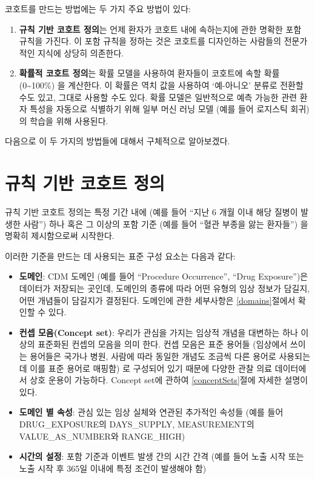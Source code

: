 \documentclass[11pt]{book}
\providecommand{\tightlist}{%
  \setlength{\itemsep}{0pt}\setlength{\parskip}{0pt}}
\theoremstyle{definition}
\theoremstyle{definition}
\theoremstyle{definition}
\theoremstyle{remark}
\begin{document}
코호트를 만드는 방법에는 두 가지 주요 방법이 있다:

\begin{enumerate}
\def\labelenumi{\arabic{enumi}.}
\tightlist
\item
  \textbf{규칙 기반 코호트 정의}는 언제 환자가 코호트 내에 속하는지에
  관한 명확한 포함 규칙을 가진다. 이 포함 규칙을 정하는 것은 코호트를
  디자인하는 사람들의 전문가적인 지식에 상당히 의존한다.
\item
  \textbf{확률적 코호트 정의}는 확률 모델을 사용하여 환자들이 코호트에
  속할 확률 (0\textasciitilde{}100\%) 을 계산한다. 이 확률은 역치 값을
  사용하여 `예-아니오' 분류로 전환할 수도 있고, 그대로 사용할 수도 있다.
  확률 모델은 일반적으로 예측 가능한 관련 환자 특성을 자동으로 식별하기
  위해 일부 머신 러닝 모델 (예를 들어 로지스틱 회귀) 의 학습을 위해
  사용된다.
\end{enumerate}

다음으로 이 두 가지의 방법들에 대해서 구체적으로 알아보겠다.

\section{규칙 기반 코호트 정의}\label{---}

규칙 기반 코호트 정의는 특정 기간 내에 (예를 들어 ``지난 6 개월 이내
해당 질병이 발생한 사람'') 하나 혹은 그 이상의 포함 기준 (예를 들어
``혈관 부종을 앓는 환자들'') 을 명확히 제시함으로써 시작한다.

이러한 기준을 만드는 데 사용되는 표준 구성 요소는 다음과 같다:

\begin{itemize}
\item
  \textbf{도메인}: CDM 도메인 (예를 들어 ``Procedure Occurrence'',
  ``Drug Exposure'')은 데이터가 저장되는 곳인데, 도메인의 종류에 따라
  어떤 유형의 임상 정보가 담길지, 어떤 개념들이 담길지가 결정된다.
  도메인에 관한 세부사항은 \ref{domains}절에서 확인할 수 있다.
\item
  \textbf{컨셉 모음(Concept set)}: 우리가 관심을 가지는 임상적 개념을
  대변하는 하나 이상의 표준화된 컨셉의 모음을 의미 한다. 컨셉 모음은
  표준 용어들 (임상에서 쓰이는 용어들은 국가나 병원, 사람에 따라 동일한
  개념도 조금씩 다른 용어로 사용되는데 이를 표준 용어로 매핑함) 로
  구성되어 있기 때문에 다양한 관찰 의료 데이터에서 상호 운용이 가능하다.
  Concept set에 관하여 \ref{conceptSets}절에 자세한 설명이 있다.
\item
  \textbf{도메인 별 속성}: 관심 있는 임상 실체와 연관된 추가적인 속성들
  (예를 들어 DRUG\_EXPOSURE의 DAYS\_SUPPLY, MEASUREMENT의
  VALUE\_AS\_NUMBER와 RANGE\_HIGH)
\item
  \textbf{시간의 설정}: 포함 기준과 이벤트 발생 간의 시간 간격 (예를
  들어 노출 시작 또는 노출 시작 후 365일 이내에 특정 조건이 발생해야 함)
\end{itemize}
\end{document}
